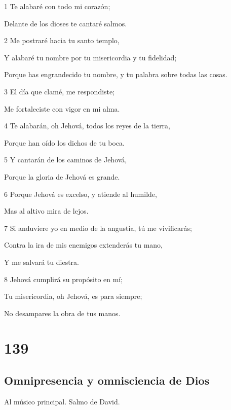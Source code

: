 \par 1 Te alabaré con todo mi corazón;
\par Delante de los dioses te cantaré salmos.
\par 2 Me postraré hacia tu santo templo,
\par Y alabaré tu nombre por tu misericordia y tu fidelidad;
\par Porque has engrandecido tu nombre, y tu palabra sobre todas las cosas.
\par 3 El día que clamé, me respondiste;
\par Me fortaleciste con vigor en mi alma.
\par 4 Te alabarán, oh Jehová, todos los reyes de la tierra,
\par Porque han oído los dichos de tu boca.
\par 5 Y cantarán de los caminos de Jehová,
\par Porque la gloria de Jehová es grande.
\par 6 Porque Jehová es excelso, y atiende al humilde,
\par Mas al altivo mira de lejos.
\par 7 Si anduviere yo en medio de la angustia, tú me vivificarás;
\par Contra la ira de mis enemigos extenderás tu mano,
\par Y me salvará tu diestra.
\par 8 Jehová cumplirá su propósito en mí;
\par Tu misericordia, oh Jehová, es para siempre;
\par No desampares la obra de tus manos.

\chapter{139}

\section*{Omnipresencia y omnisciencia de Dios}

\par Al músico principal. Salmo de David.


